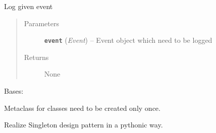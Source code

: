\documentclass[letterpaper,10pt,english]{sphinxmanual}
\begin{document}
\begin{fulllineitems}
\begin{fulllineitems}
\begin{quote}
\begin{description}
\end{description}\end{quote}

\end{fulllineitems}


\begin{fulllineitems}
\label{util/misc:escape.util.misc.SimpleStandaloneHelper._log_event}
Log given event
\begin{quote}\begin{description}
\item[{Parameters}] \leavevmode
\textbf{\texttt{event}} (\emph{Event}) -- Event object which need to be logged

\item[{Returns}] \leavevmode
None

\end{description}\end{quote}

\end{fulllineitems}


\end{fulllineitems}


\begin{fulllineitems}
\label{util/misc:escape.util.misc.Singleton}
Bases: \href{https://docs.python.org/2.7/library/functions.html\#type}{}

Metaclass for classes need to be created only once.

Realize Singleton design pattern in a pythonic way.

\begin{fulllineitems}
\label{util/misc:escape.util.misc.Singleton._instances}
\end{fulllineitems}


\begin{fulllineitems}
\label{util/misc:escape.util.misc.Singleton.__call__}
\end{fulllineitems}


\end{fulllineitems}
\end{document}
